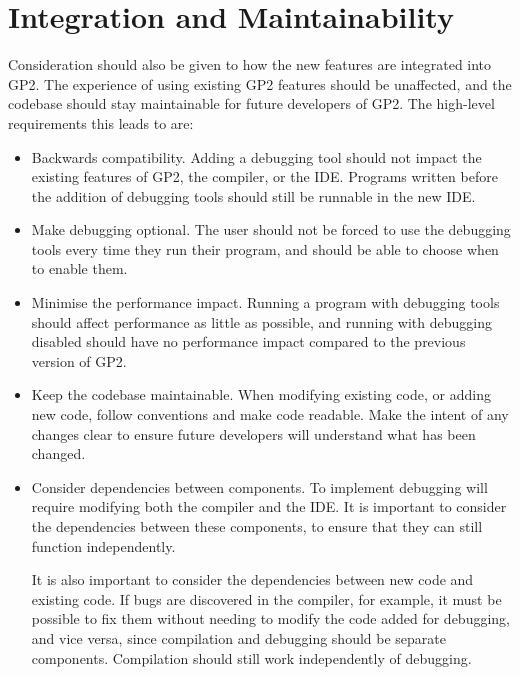 \documentclass[authoryearcitations]{UoYCSproject}
\begin{document}

\section{Integration and Maintainability}
\label{sec:IntegrationAndMaintainability}

Consideration should also be given to how the new features are integrated into
GP2. The experience of using existing GP2 features should be unaffected, and the
codebase should stay maintainable for future developers of GP2. The high-level
requirements this leads to are:

\begin{itemize}
    \item Backwards compatibility. Adding a debugging tool should not impact the
          existing features of GP2, the compiler, or the IDE. Programs written
          before the addition of debugging tools should still be runnable in the
          new IDE.

    \item Make debugging optional. The user should not be forced to use the
          debugging tools every time they run their program, and should be able
          to choose when to enable them.

    \item Minimise the performance impact. Running a program with debugging tools
          should affect performance as little as possible, and running with
          debugging disabled should have no performance impact compared to the
          previous version of GP2.

    \item Keep the codebase maintainable. When modifying existing code, or adding
          new code, follow conventions and make code readable. Make the intent
          of any changes clear to ensure future developers will understand what
          has been changed.

    \item Consider dependencies between components. To implement debugging will
          require modifying both the compiler and the IDE. It is important to
          consider the dependencies between these components, to ensure that
          they can still function independently.

          It is also important to consider the dependencies between new code and
          existing code. If bugs are discovered in the compiler, for example, it
          must be possible to fix them without needing to modify the code added
          for debugging, and vice versa, since compilation and debugging should
          be separate components. Compilation should still work independently
          of debugging. 
\end{itemize}
\end{document}
